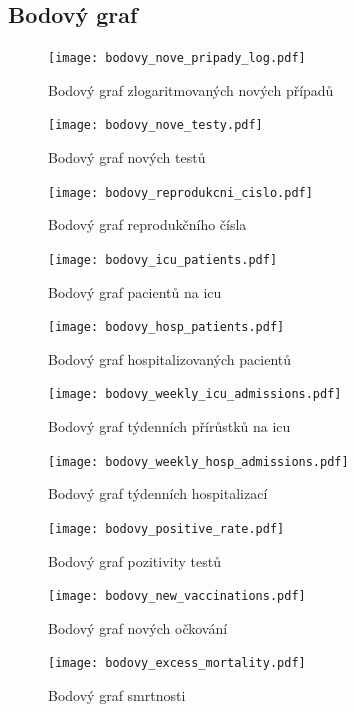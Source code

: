 \documentclass[a4paper]{ article}
\begin{document}
\subsection{Bodový graf}
\begin{figure}[H]
\centering

\texttt{[image: bodovy\_nove\_pripady\_log.pdf]}
\caption{Bodový graf zlogaritmovaných nových případů}

\texttt{[image: bodovy\_nove\_testy.pdf]}
\caption{Bodový graf nových testů}

\end{figure}
\begin{figure}[H]
\centering

\texttt{[image: bodovy\_reprodukcni\_cislo.pdf]}
\caption{Bodový graf reprodukčního čísla}

\texttt{[image: bodovy\_icu\_patients.pdf]}
\caption{Bodový graf pacientů na icu}

\end{figure}
\begin{figure}[H]
\centering

\texttt{[image: bodovy\_hosp\_patients.pdf]}
\caption{Bodový graf hospitalizovaných pacientů}

\texttt{[image: bodovy\_weekly\_icu\_admissions.pdf]}
\caption{Bodový graf týdenních přírůstků na icu}

\end{figure}
\begin{figure}[H]
\centering

\texttt{[image: bodovy\_weekly\_hosp\_admissions.pdf]}
\caption{Bodový graf týdenních hospitalizací}

\texttt{[image: bodovy\_positive\_rate.pdf]}
\caption{Bodový graf pozitivity testů}

\end{figure}
\begin{figure}[H]
\centering

\texttt{[image: bodovy\_new\_vaccinations.pdf]}
\caption{Bodový graf nových očkování}

\texttt{[image: bodovy\_excess\_mortality.pdf]}
\caption{Bodový graf smrtnosti}

\end{figure}
\end{document}
